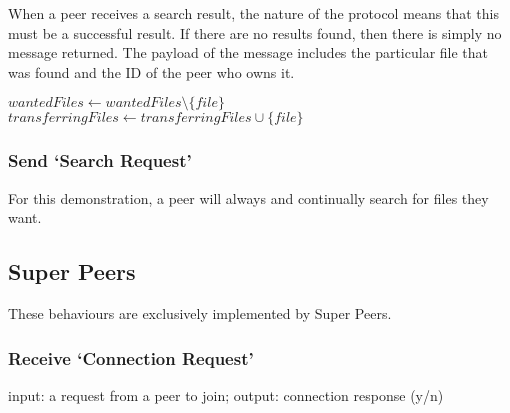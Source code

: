 When a peer receives a search result, the nature of the protocol means that this
must be a successful result. If there are no results found, then there is simply
no message returned.  The payload of the message includes the particular file
that was found and the ID of the peer who owns it.

\begin{algorithm}[H]

  $wantedFiles \leftarrow wantedFiles \setminus \{file\}$\;
  \;
  $transferringFiles \leftarrow transferringFiles \cup \{file\}$\;
\end{algorithm}

\subsubsection{Send `Search Request'}

For this demonstration, a peer will always and continually search for files they
want.

\begin{algorithm}[H]

\end{algorithm}

\subsection{Super Peers}

These behaviours are exclusively implemented by Super Peers.

\subsubsection{Receive `Connection Request'}
input: a request from a peer to join; output: connection response (y/n)

